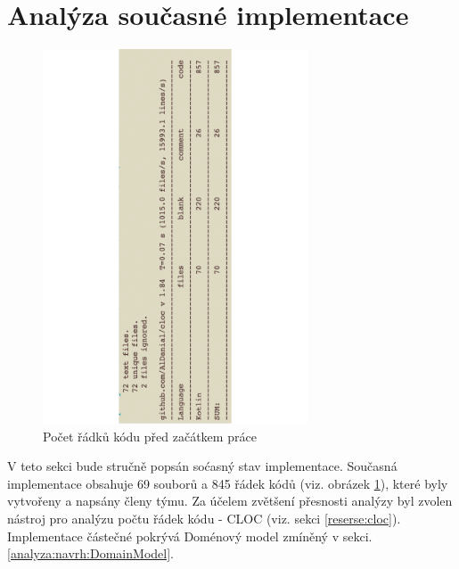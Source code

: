 \section{Analýza současné implementace}\label{analyza:soucasnaImplementace}
    \begin{figure}\centering
	   \includegraphics[angle=-90, width=0.7\textwidth]{pdfs/Cloc1}
	   \caption[Počet řádků kódu před začátkem práce]{Počet řádků kódu před začátkem práce}\label{image:cloc1}
    \end{figure}
     V teto sekci bude stručně popsán soćasný stav implementace. Současná implementace obsahuje 69 souborů a 845 řádek kódů (viz. obrázek \ref{image:cloc1}), které byly vytvořeny a napsány členy týmu. Za účelem zvětšení přesnosti analýzy byl zvolen nástroj pro analýzu počtu řádek kódu - CLOC (viz. sekci \ref{reserse:cloc}). Implementace částečné pokrývá Doménový model zmíněný v sekci. \ref{analyza:navrh:DomainModel}.
        
